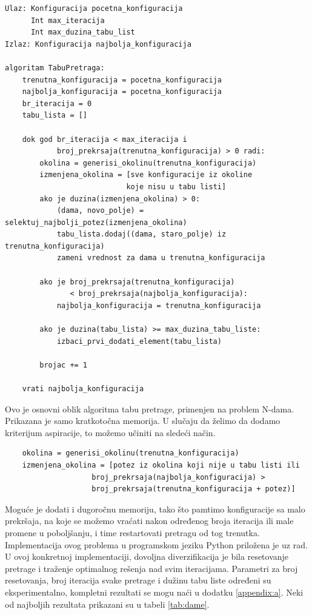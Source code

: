 \documentclass[a4paper]{article}
\begin{document}
\begin{lstlisting}
Ulaz: Konfiguracija pocetna_konfiguracija
      Int max_iteracija
      Int max_duzina_tabu_list
Izlaz: Konfiguracija najbolja_konfiguracija

algoritam TabuPretraga:
    trenutna_konfiguracija = pocetna_konfiguracija
    najbolja_konfiguracija = pocetna_konfiguracija
    br_iteracija = 0
    tabu_lista = []
    
    dok god br_iteracija < max_iteracija i
            broj_prekrsaja(trenutna_konfiguracija) > 0 radi:
        okolina = generisi_okolinu(trenutna_konfiguracija)
        izmenjena_okolina = [sve konfiguracije iz okoline 
                            koje nisu u tabu listi]
        ako je duzina(izmenjena_okolina) > 0:
            (dama, novo_polje) = selektuj_najbolji_potez(izmenjena_okolina)
            tabu_lista.dodaj((dama, staro_polje) iz trenutna_konfiguracija)
            zameni vrednost za dama u trenutna_konfiguracija
            
        ako je broj_prekrsaja(trenutna_konfiguracija) 
               < broj_prekrsaja(najbolja_konfiguracija):
            najbolja_konfiguracija = trenutna_konfiguracija
        
        ako je duzina(tabu_lista) >= max_duzina_tabu_liste:
            izbaci_prvi_dodati_element(tabu_lista)
            
        brojac += 1
    
    vrati najbolja_konfiguracija
\end{lstlisting}

Ovo je osnovni oblik algoritma tabu pretrage, primenjen na problem N-dama. Prikazana je samo kratkotočna memorija. U slučaju da želimo da dodamo kriterijum aspiracije, to možemo učiniti na sledeći način.

\begin{lstlisting}
    okolina = generisi_okolinu(trenutna_konfiguracija)
    izmenjena_okolina = [potez iz okolina koji nije u tabu listi ili 
                    broj_prekrsaja(najbolja_konfiguracija) >
                    broj_prekrsaja(trenutna_konfiguracija + potez)]
\end{lstlisting}

Moguće je dodati i dugoročnu memoriju, tako što pamtimo konfiguracije sa malo prekršaja, na koje se možemo vraćati nakon određenog broja iteracija ili male promene u poboljšanju, i time restartovati pretragu od tog trenutka. Implementacija ovog problema u programskom jeziku Python priložena je uz rad. U ovoj konkretnoj implementaciji, dovoljna diverzifikacija je bila resetovanje pretrage i traženje optimalnog rešenja nad svim iteracijama. Parametri za broj resetovanja, broj iteracija svake pretrage i dužinu tabu liste određeni su eksperimentalno, kompletni rezultati se mogu naći u dodatku \ref{appendix:a}.  Neki od najboljih rezultata prikazani su u tabeli \ref{tab:dame}.\\
\end{document}
